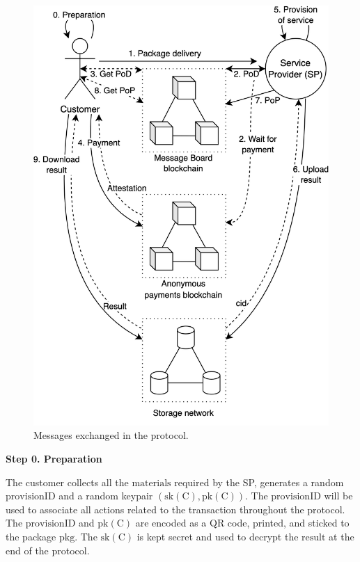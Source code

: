 \documentclass{ieeeaccess}
\begin{document}
\begin{figure}[h!]
\includegraphics[width=\linewidth]{anonser-protocol.png}
\centering
\caption{Messages exchanged in the protocol.}
\label{fig:protocol-diagram}
\end{figure}

\noindent \textbf
{Step 0.  Preparation}\label{step-0-preparation}

The customer collects all the $\mathrm{materials}$ required by the SP, generates a random $\mathrm{provisionID}$ and a random keypair $(\mathrm{sk(C)},\mathrm{pk(C)})$. The $\mathrm{provisionID}$ will be used to associate all actions related to the transaction throughout the protocol. The $\mathrm{provisionID}$ and $\mathrm{pk(C)}$ are encoded as a QR code, printed, and sticked to the package $\mathrm{pkg}$. The $\mathrm{sk(C)}$ is kept secret and used to decrypt the $\mathrm{result}$ at the end of the protocol.
\end{document}
